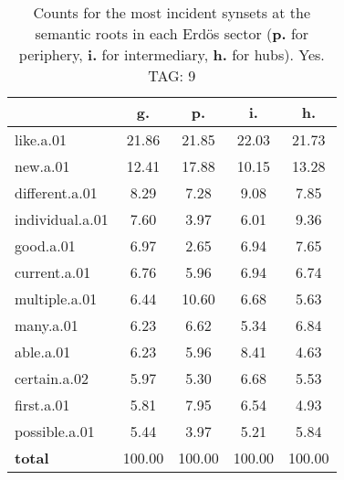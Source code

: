 \begin{table}[h!]
\begin{center}
\begin{tabular}{| l || c | c | c | c |}\hline
 & {\bf g.} & {\bf p.} & {\bf i.} & {\bf h.} \\\hline\hline
like.a.01 & 21.86  & 21.85  & 22.03  & 21.73 \\\hline
new.a.01 & 12.41  & 17.88  & 10.15  & 13.28 \\\hline
different.a.01 & 8.29  & 7.28  & 9.08  & 7.85 \\\hline
individual.a.01 & 7.60  & 3.97  & 6.01  & 9.36 \\\hline
good.a.01 & 6.97  & 2.65  & 6.94  & 7.65 \\\hline
current.a.01 & 6.76  & 5.96  & 6.94  & 6.74 \\\hline
multiple.a.01 & 6.44  & 10.60  & 6.68  & 5.63 \\\hline
many.a.01 & 6.23  & 6.62  & 5.34  & 6.84 \\\hline
able.a.01 & 6.23  & 5.96  & 8.41  & 4.63 \\\hline
certain.a.02 & 5.97  & 5.30  & 6.68  & 5.53 \\\hline
first.a.01 & 5.81  & 7.95  & 6.54  & 4.93 \\\hline
possible.a.01 & 5.44  & 3.97  & 5.21  & 5.84 \\\hline\hline
{{\bf total}} & 100.00  & 100.00  & 100.00  & 100.00 \\\hline
\end{tabular}
\caption{Counts for the most incident synsets at the semantic roots in each Erd\"os sector ({\bf p.} for periphery, {\bf i.} for intermediary, {\bf h.} for hubs). Yes. TAG: 9}
\end{center}
\end{table}